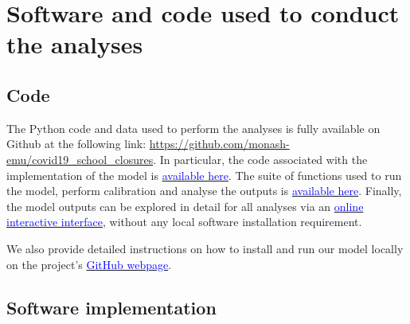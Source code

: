 \section{Software and code used to conduct the analyses}

\subsection{Code}
The Python code and data used to perform the analyses is fully available on Github at the following link:
\url{https://github.com/monash-emu/covid19_school_closures}. In particular, the code 
associated with the implementation of the model is \href{https://github.com/monash-emu/covid19_school_closures/blob/master/autumn/models/sm_covid2/model.py#L184-L549}{\textcolor{blue}{available here}}.
The suite of functions used to run the model, perform calibration and analyse the outputs is \href{https://github.com/monash-emu/covid19_school_closures/blob/master/autumn/projects/sm_covid2/common_school/runner_tools.py}{\textcolor{blue}{available here}}.
Finally, the model outputs can be explored in detail for all analyses via an \href{https://monash-emu.github.io/outputs/covid19-school-closures/}{\textcolor{blue}{online interactive interface}}, without
any local software installation requirement. 

We also provide detailed instructions on how to install and run our model locally on the project's \href{https://github.com/monash-emu/covid19_school_closures/blob/master/README.md}{\textcolor{blue}{GitHub webpage}}. 

\subsection{Software implementation}
